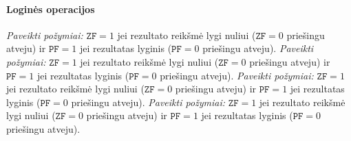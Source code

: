 \documentclass{scrartcl}
\begin{document}
                \paragraph{Loginės operacijos}
                    \emph{Paveikti požymiai:} $\texttt{ZF} = 1$ jei rezultato reikšmė lygi nuliui ($\texttt{ZF} = 0$ priešingu atveju) ir $\texttt{PF} = 1$ jei rezultatas lyginis ($\texttt{PF} = 0$ priešingu atveju).
                    \emph{Paveikti požymiai:} $\texttt{ZF} = 1$ jei rezultato reikšmė lygi nuliui ($\texttt{ZF} = 0$ priešingu atveju) ir $\texttt{PF} = 1$ jei rezultatas lyginis ($\texttt{PF} = 0$ priešingu atveju).
                    \emph{Paveikti požymiai:} $\texttt{ZF} = 1$ jei rezultato reikšmė lygi nuliui ($\texttt{ZF} = 0$ priešingu atveju) ir $\texttt{PF} = 1$ jei rezultatas lyginis ($\texttt{PF} = 0$ priešingu atveju).
                    \emph{Paveikti požymiai:} $\texttt{ZF} = 1$ jei rezultato reikšmė lygi nuliui ($\texttt{ZF} = 0$ priešingu atveju) ir $\texttt{PF} = 1$ jei rezultatas lyginis ($\texttt{PF} = 0$ priešingu atveju).
\end{document}
